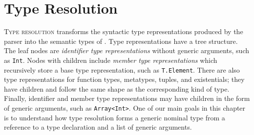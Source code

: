 \documentclass[../generics]{subfiles}
\begin{document}
\chapter{Type Resolution}\label{chap:type resolution}

\lettrine{T}{ype resolution} transforms the syntactic type representations produced by the parser into the semantic types of . Type representations have a tree structure. The leaf nodes are \emph{identifier type representations} without generic arguments, such as \texttt{Int}. Nodes with children include \emph{member type representations} which recursively store a base type representation, such as \texttt{T.Element}. There are also type representations for function types, metatypes, tuples, and existentials; they have children and follow the same shape as the corresponding kind of type. Finally, identifier and member type representations may have children in the form of generic arguments, such as \texttt{Array<Int>}. One of our main goals in this chapter is to understand how type resolution forms a generic nominal type from a reference to a type declaration and a list of generic arguments.
\end{document}
